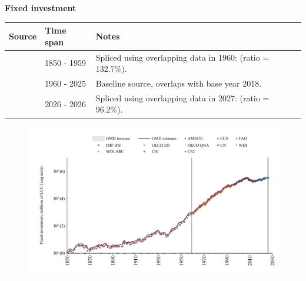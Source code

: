 \documentclass[12pt,a4paper,landscape]{article}
\begin{document}
\begin{adjustbox}{max totalsize={\paperwidth}{\paperheight},center}
\begin{minipage}[t][\textheight][t]{\textwidth}
\vspace*{0.5cm}
{}
\begin{center}
{\Large\bfseries Fixed investment}
\end{center}
\vspace{0.5cm}
\begin{table}[H]
\centering
\small
\begin{tabular}{|l|l|l|}
\hline
\textbf{Source} & \textbf{Time span} & \textbf{Notes} \\
\hline
\rowcolor{white}\cite{CS2_ESP}& 1850 - 1959 &Spliced using overlapping data in 1960: (ratio = 132.7\%). \\
\rowcolor{lightgray}\cite{OECD_EO}& 1960 - 2025 &Baseline source, overlaps with base year 2018. \\
\rowcolor{white}\cite{AMECO}& 2026 - 2026 &Spliced using overlapping data in 2027: (ratio = 96.2\%). \\
\hline
\end{tabular}
\end{table}
\begin{figure}[H]
\centering
\includegraphics[width=\textwidth,height=0.6\textheight,keepaspectratio]{graphs/ESP_finv.pdf}
\end{figure}
\end{minipage}
\end{adjustbox}
\end{document}
